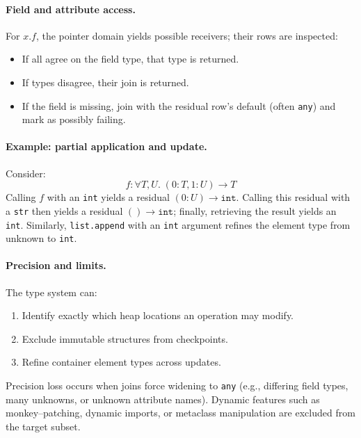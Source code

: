 \paragraph{Field and attribute access.}
For $x.f$, the pointer domain yields possible receivers; their rows are inspected:
\begin{itemize}
  \item If all agree on the field type, that type is returned.
  \item If types disagree, their join is returned.
  \item If the field is missing, join with the residual row's default (often \texttt{any}) and mark as possibly failing.
\end{itemize}

\paragraph{Example: partial application and update.}
Consider:
\[
f : \forall T,U.\; (0:T, 1:U) \to T
\]
Calling $f$ with an \texttt{int} yields a residual $(0:U) \to \texttt{int}$.  
Calling this residual with a \texttt{str} then yields a residual  $() \to \texttt{int}$; finally, retrieving the result yields an \texttt{int}.  
Similarly, \texttt{list.append} with an \texttt{int} argument refines the element type from unknown to \texttt{int}.

\paragraph{Precision and limits.}
The type system can:
\begin{enumerate}
  \item Identify exactly which heap locations an operation may modify.
  \item Exclude immutable structures from checkpoints.
  \item Refine container element types across updates.
\end{enumerate}
Precision loss occurs when joins force widening to \texttt{any} (e.g., differing field types, many unknowns, or unknown attribute names).  
Dynamic features such as monkey--patching, dynamic imports, or metaclass manipulation are excluded from the target subset.
